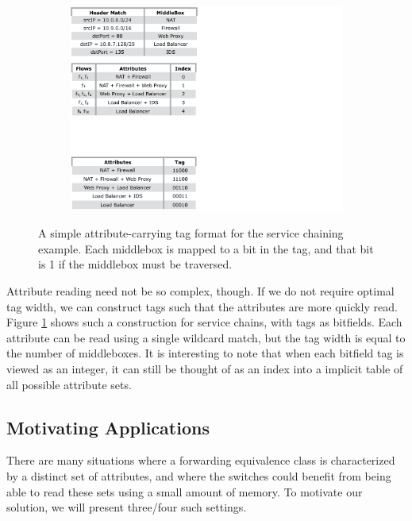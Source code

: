 \begin{figure}[t!] 
\begin{minipage}{1\linewidth}
\begin{subfigure}[c]{0.96\linewidth}
\includegraphics[trim={0 0 19cm 19.5cm}, clip, width=\linewidth]{figures/mbox_path_example3}
\end{subfigure} 
\end{minipage} 
\caption{A simple attribute-carrying tag format for the service chaining example. Each middlebox is mapped to a bit in the tag, and that bit is 1 if the middlebox must be traversed.}
\label{fig:att_tags}
\end{figure}

Attribute reading need not be so complex, though. If we do not require optimal tag width, we can construct tags such that the attributes are more quickly read. Figure \ref{fig:att_tags} shows such a construction for service chains, with tags as bitfields. Each attribute can be read using a single wildcard match, but the tag width is equal to the number of middleboxes. It is interesting to note that when each bitfield tag is viewed as an integer, it can still be thought of as an index into a implicit table of all possible attribute sets. 


\subsection{Motivating Applications}
There are many situations where a forwarding equivalence class is characterized by a distinct set of attributes, and where the switches could benefit from being able to read these sets using a small amount of memory. To motivate our solution, we will present three/four such settings. 

